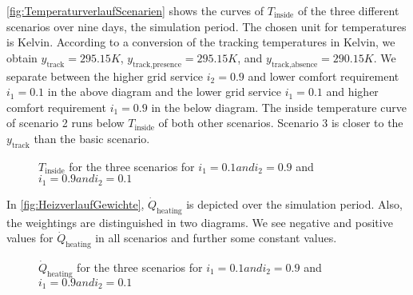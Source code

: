 \autoref{fig:TemperaturverlaufScenarien} shows the curves of $T_\text{inside}$ of the three different scenarios over nine days, the simulation period. The chosen unit for temperatures is Kelvin. According to a conversion of the tracking temperatures in Kelvin, we obtain $y_\text{track} = 295.15 K$, $y_\text{track,presence} = 295.15 K$, and $y_\text{track,absence} = 290.15 K$. We separate between the higher grid service $i_\text{2} = 0.9$ and lower comfort requirement $i_\text{1} = 0.1$ in the above diagram and the lower grid service $i_\text{1} = 0.1$ and higher comfort requirement $i_\text{1} = 0.9$ in the below diagram.\newline 
The inside temperature curve of scenario 2 runs below $T_\text{inside}$ of both other scenarios. Scenario 3 is closer to the $y_\text{track}$ than the basic scenario. 
    \begin{figure}[H]
           \centering
        \def\svgwidth{1\textwidth}
        
        \caption{$T_\text{inside}$ for the three scenarios for $i_\text{1} = 0.1 and i_\text{2} = 0.9$ and $i_\text{1} = 0.9 and i_\text{2} = 0.1$}
         \label{fig:TemperaturverlaufScenarien}
    \end{figure}
 
In \autoref{fig:HeizverlaufGewichte}, $\dot{Q}_\text{heating}$ is depicted over the simulation period. Also, the weightings are distinguished in two diagrams. We see negative and positive values for $\dot{Q}_\text{heating}$ in all scenarios and further some constant values.
     \begin{figure}[H]
           \centering
        \def\svgwidth{1.05\textwidth}
        
        \caption{$\dot{Q}_\text{heating}$ for the three scenarios for $i_\text{1} = 0.1 and i_\text{2} = 0.9$ and $i_\text{1} = 0.9 and i_\text{2} = 0.1$}
         \label{fig:HeizverlaufGewichte}
    \end{figure}
    
